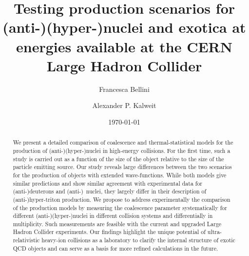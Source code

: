 \documentclass[%
 reprint,
 amsmath,amssymb,
 aps,
]{revtex4-1}
\begin{document}

\title{Testing production scenarios for (anti-)(hyper-)nuclei and exotica at energies available at the CERN Large Hadron Collider}

\author{Francesca Bellini}
\author{Alexander P. Kalweit}

\date{\today}

\begin{abstract}
We present a detailed comparison of coalescence and thermal-statistical models for the production of (anti-)(hyper-)nuclei in high-energy collisions. For the first time, such a study is carried out as a function of the size of the object relative to the size of the particle emitting source. Our study reveals large differences between the two scenarios for the production of objects with extended wave-functions. While both models give similar predictions and show similar agreement with experimental data for (anti-)deuterons and (anti-)\hethree\ nuclei, they largely differ in their description of (anti-)hyper-triton production.
We propose to address experimentally the comparison of the production models by measuring the coalescence parameter systematically for different (anti-)(hyper-)nuclei in different collision systems and differentially in multiplicity. 
Such measurements are feasible with the current and upgraded Large Hadron Collider experiments. 
Our findings highlight the unique potential of ultra-relativistic heavy-ion collisions as a laboratory to clarify the internal structure of exotic QCD objects and can serve as a basis for more refined calculations in the future.
\end{abstract}


\maketitle
\end{document}

